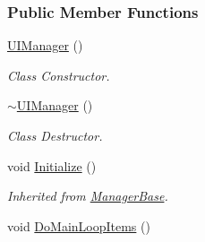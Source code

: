 \subsubsection*{Public Member Functions}
\begin{DoxyCompactItemize}
\item 
\hyperlink{classphys_1_1UIManager_aeb502f11f170efd806b4153923c55359}{UIManager} ()
\begin{DoxyCompactList}\small\item\em Class Constructor. \item\end{DoxyCompactList}\item 
\hyperlink{classphys_1_1UIManager_a203144f08dbaf8068746359c22aa4f1e}{$\sim$UIManager} ()
\begin{DoxyCompactList}\small\item\em Class Destructor. \item\end{DoxyCompactList}\item 
\hypertarget{classphys_1_1UIManager_af04e60c4f09c114ec3bf32babdb64ab7}{
void \hyperlink{classphys_1_1UIManager_af04e60c4f09c114ec3bf32babdb64ab7}{Initialize} ()}
\label{classphys_1_1UIManager_af04e60c4f09c114ec3bf32babdb64ab7}

\begin{DoxyCompactList}\small\item\em Inherited from \hyperlink{classphys_1_1ManagerBase}{ManagerBase}. \item\end{DoxyCompactList}\item 
\hypertarget{classphys_1_1UIManager_a972abedcd4343dc5966580f2f82494a8}{
void \hyperlink{classphys_1_1UIManager_a972abedcd4343dc5966580f2f82494a8}{DoMainLoopItems} ()}
\label{classphys_1_1UIManager_a972abedcd4343dc5966580f2f82494a8}


\end{DoxyCompactItemize}
